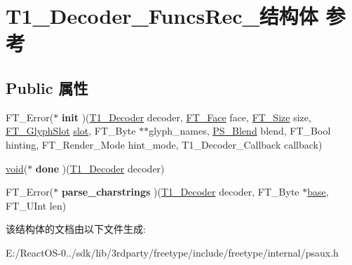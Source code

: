 \hypertarget{struct_t1___decoder___funcs_rec__}{}\section{T1\+\_\+\+Decoder\+\_\+\+Funcs\+Rec\+\_\+结构体 参考}
\label{struct_t1___decoder___funcs_rec__}
\subsection*{Public 属性}
\begin{DoxyCompactItemize}
\item 
\mbox{\label{struct_t1___decoder___funcs_rec___ac6c6d5e56e3413bdb3802668e4ce3de7}} 
F\+T\+\_\+\+Error($\ast$ {\bfseries init} )(\hyperlink{struct_t1___decoder_rec__}{T1\+\_\+\+Decoder} decoder, \hyperlink{struct_f_t___face_rec__}{F\+T\+\_\+\+Face} face, \hyperlink{struct_f_t___size_rec__}{F\+T\+\_\+\+Size} size, \hyperlink{struct_f_t___glyph_slot_rec__}{F\+T\+\_\+\+Glyph\+Slot} \hyperlink{struct__slot}{slot}, F\+T\+\_\+\+Byte $\ast$$\ast$glyph\+\_\+names, \hyperlink{struct_p_s___blend_rec__}{P\+S\+\_\+\+Blend} blend, F\+T\+\_\+\+Bool hinting, F\+T\+\_\+\+Render\+\_\+\+Mode hint\+\_\+mode, T1\+\_\+\+Decoder\+\_\+\+Callback callback)
\item 
\mbox{\label{struct_t1___decoder___funcs_rec___a766b605fd0a10755d9ce14d2bfea3bc5}} 
\hyperlink{interfacevoid}{void}($\ast$ {\bfseries done} )(\hyperlink{struct_t1___decoder_rec__}{T1\+\_\+\+Decoder} decoder)
\item 
\mbox{\label{struct_t1___decoder___funcs_rec___acef414b0ecbec6da63a11c1d94fb7c3e}} 
F\+T\+\_\+\+Error($\ast$ {\bfseries parse\+\_\+charstrings} )(\hyperlink{struct_t1___decoder_rec__}{T1\+\_\+\+Decoder} decoder, F\+T\+\_\+\+Byte $\ast$\hyperlink{structbase}{base}, F\+T\+\_\+\+U\+Int len)
\end{DoxyCompactItemize}


该结构体的文档由以下文件生成\+:\begin{DoxyCompactItemize}
\item 
E\+:/\+React\+O\+S-\/0../sdk/lib/3rdparty/freetype/include/freetype/internal/psaux.\+h\end{DoxyCompactItemize}
